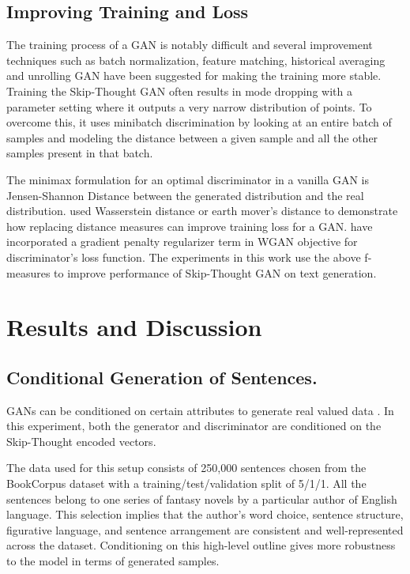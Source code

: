 \documentclass[11pt,a4paper]{article}
\begin{document}
\subsection{\label{sec:34}Improving Training and Loss}
The training process of a GAN is notably difficult \cite{improveTrainGAN}
and several improvement techniques such as batch normalization, feature matching, historical averaging \cite{improveTrainGAN} and unrolling GAN \cite{unrollGAN} have been suggested for making the training
more stable. 
Training the Skip-Thought GAN often results in mode 
dropping \cite{trainGAN, veeGAN} with a parameter setting where it outputs a very narrow 
distribution of points. To overcome this, it uses minibatch discrimination by 
looking at an entire batch of samples and modeling the distance
between a given sample and all the other samples present in that batch.

The minimax formulation for an optimal discriminator in a vanilla GAN is 
Jensen-Shannon Distance between the generated distribution and 
the real distribution.  used Wasserstein distance or
earth mover's distance to demonstrate how replacing distance measures can improve training loss for a GAN.  have incorporated
a gradient penalty regularizer term in WGAN objective for discriminator's 
loss function. The experiments in this work use the above f-measures to improve performance of Skip-Thought GAN on text generation. 



\section{Results and Discussion} 
\subsection{Conditional Generation of Sentences.}
GANs can be conditioned on certain attributes to generate real valued data \cite{cgan, dcgan}. In this experiment, both the generator and discriminator are conditioned on the Skip-Thought encoded vectors.

The data used for this setup consists of 250,000 sentences chosen from the BookCorpus dataset
\cite{bookCorpus} with a training/test/validation split of 5/1/1. All the sentences belong to one series of fantasy novels by a particular author of English language. This selection implies that the author's word choice, sentence structure, figurative language, and sentence arrangement are consistent and well-represented across the dataset. Conditioning on this high-level outline gives more robustness to the model in terms of generated samples. 
\end{document}

